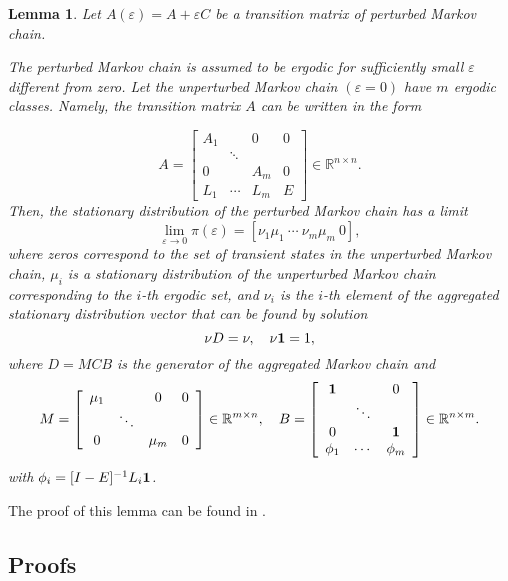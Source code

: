 \documentclass{article}
\newtheorem{lemma}{Lemma}
\newcommand{\eps}{\varepsilon}
\newcommand{\one}{{\bf 1}}
\begin{document}
\begin{lemma}
\label{lm:SPMC}
Let $A(\eps)=A+\eps C$ be a transition matrix of perturbed Markov chain.

The perturbed Markov chain is assumed to be ergodic for sufficiently small
$\eps$ different from zero. Let the unperturbed Markov chain $(\eps =0)$
have $m$ ergodic classes. Namely, the transition matrix $A$ can be written
in the form

$$
A=\left[ \begin{array}{cccc}
A_1 &        & 0   & 0 \\
    & \ddots &     &   \\
0   &        & A_m & 0 \\
L_1 & \cdots & L_m & E
\end{array} \right] \in \mathbb{R}^{n\times n}.
$$
Then, the stationary distribution of the perturbed Markov chain has a limit
$$
\lim_{\eps \to 0} \pi(\eps) =[\nu_1\mu_1 \ \cdots \ \nu_m\mu_m \ 0],
$$
where zeros correspond to the set of transient states in the unperturbed
Markov chain, $\mu_i$ is a stationary distribution of the unperturbed Markov
chain corresponding to the $i$-th ergodic set, and $\nu_i$ is the $i$-th
element of the aggregated stationary distribution vector that can be found
by solution
$$
\nu D = \nu, \quad \nu \one =1,
$$
where $D=MCB$ is the generator of the aggregated Markov chain and
$$
M=\left[ \begin{array}{cccc}
\mu_1 &        & 0   & 0 \\
    & \ddots &     &   \\
0   &        & \mu_m & 0
\end{array} \right] \in \mathbb{R}^{m\times n},\quad
B=
\left[ \begin{array}{cccc}
\one &        & 0    \\
    & \ddots &      \\
0   &        & \one  \\
\phi_1 & \cdots & \phi_m
\end{array} \right] \in \mathbb{R}^{n\times m}.
$$
with $\phi_i=[I-E]^{-1}L_i\one$.
\end{lemma}
The proof of this lemma can be found in
\cite{Avrachenkov99thesis,KorolyukTurbin,YinZhang}.

\subsection{Proofs}
\label{app:proofs}
\end{document}
